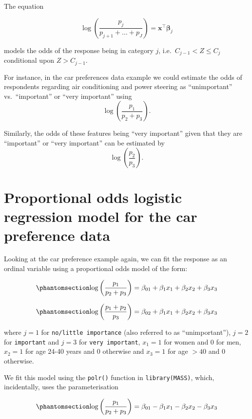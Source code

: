 \documentclass[
  letterpaper,
  DIV=11,
  numbers=noendperiod]{scrartcl}
\begin{document}
\begin{tcolorbox}
The equation

\[
   \log \left(\frac{p_j}{p_{j+1}+\dots+p_J}\right)=\boldsymbol{x}^\intercal \boldsymbol{\beta}_j
\]

models the odds of the response being in category \(j\),
i.e.~\(C_{j-1}<Z\leq C_j\) conditional upon \(Z>C_{j-1}\).

For instance, in the car preferences data example we could estimate the
odds of respondents regarding air conditioning and power steering as
``unimportant'' vs.~``important'' or ``very important'' using
\[\log \left(\frac{p_1}{p_2+p_3}\right).\]

Similarly, the odds of these features being ``very important'' given
that they are ``important'' or ``very important'' can be estimated by
\[\log \left(\frac{p_2}{p_3}\right).\]

\end{tcolorbox}

\section{Proportional odds logistic regression model for the car
preference
data}\label{proportional-odds-logistic-regression-model-for-the-car-preference-data}

Looking at the car preference example again, we can fit the response as
an ordinal variable using a proportional odds model of the form:

\begin{equation}\phantomsection\label{eq-polr1}{
\log \left(\frac {p_1} {p_2+p_3} \right)= \beta_{01} + \beta_{1}x_1 + \beta_{2}x_2 +\beta_{3}x_3
}\end{equation}

\begin{equation}\phantomsection\label{eq-polr2}{
\log \left(\frac {p_1+p_2} {p_3}\right) = \beta_{02} + \beta_{1}x_1 + \beta_{2}x_2 +\beta_{3}x_3 
}\end{equation}

where \(j=1\) for \texttt{no/little\ importance} (also referred to as
``unimportant''), \(j=2\) for \texttt{important} and \(j=3\) for
\texttt{very\ important}, \(x_1 =1\) for women and 0 for men,
\(x_2 = 1\) for age 24-40 years and 0 otherwise and \(x_3 = 1\) for age
\(> 40\) and 0 otherwise.

We fit this model using the \texttt{polr()} function in
\texttt{library(MASS)}, which, incidentally, uses the parameterisation

\begin{equation}\phantomsection\label{eq-polr3}{
\log \left(\frac {p_1} {p_2+p_3} \right)= \beta_{01} - \beta_{1}x_1 - \beta_{2}x_2 -\beta_{3}x_3 
}\end{equation}
\end{document}
